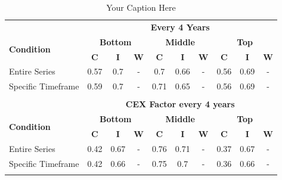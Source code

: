 \begin{table}[h!]
\centering
\begin{tabular}{l c c c c c c c c c}
\toprule\toprule
&\multicolumn{9}{c}{\textbf{Every 4 Years}} \vspace{2mm}\\
\multirow{2}{*}{\textbf{Condition}} & \multicolumn{3}{c}{\textbf{Bottom}} & \multicolumn{3}{c}{\textbf{Middle}} & \multicolumn{3}{c}{\textbf{Top}} \\
& \textbf{C}& \textbf{I}& \textbf{W}& \textbf{C}& \textbf{I}& \textbf{W}& \textbf{C}& \textbf{I}& \textbf{W} \\
Entire Series & 0.57 & 0.7 & - & 0.7 & 0.66 & - & 0.56 & 0.69 & - \\
Specific Timeframe & 0.59 & 0.7 & - & 0.71 & 0.65 & - & 0.56 & 0.69 & - \\
\vspace{2mm}\\
&\multicolumn{9}{c}{\textbf{CEX Factor every 4 years}} \vspace{2mm}\\
\multirow{2}{*}{\textbf{Condition}} & \multicolumn{3}{c}{\textbf{Bottom}} & \multicolumn{3}{c}{\textbf{Middle}} & \multicolumn{3}{c}{\textbf{Top}} \\
& \textbf{C}& \textbf{I}& \textbf{W}& \textbf{C}& \textbf{I}& \textbf{W}& \textbf{C}& \textbf{I}& \textbf{W} \\
Entire Series & 0.42 & 0.67 & - & 0.76 & 0.71 & - & 0.37 & 0.67 & - \\
Specific Timeframe & 0.42 & 0.66 & - & 0.75 & 0.7 & - & 0.36 & 0.66 & - \\
\vspace{2mm}\\
\bottomrule\bottomrule
\end{tabular}
\caption{Your Caption Here}
\label{tab:your_label}
\end{table}
